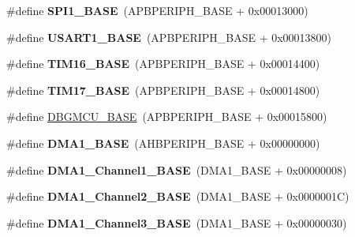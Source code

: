 \begin{DoxyCompactItemize}
\#define {\bfseries S\+P\+I1\+\_\+\+B\+A\+SE}~(A\+P\+B\+P\+E\+R\+I\+P\+H\+\_\+\+B\+A\+SE + 0x00013000)
\item 
\mbox{\label{group___peripheral__memory__map_ga86162ab3f740db9026c1320d46938b4d}} 
\#define {\bfseries U\+S\+A\+R\+T1\+\_\+\+B\+A\+SE}~(A\+P\+B\+P\+E\+R\+I\+P\+H\+\_\+\+B\+A\+SE + 0x00013800)
\item 
\mbox{\label{group___peripheral__memory__map_ga16c97093a531d763b0794c3e6d09e1bf}} 
\#define {\bfseries T\+I\+M16\+\_\+\+B\+A\+SE}~(A\+P\+B\+P\+E\+R\+I\+P\+H\+\_\+\+B\+A\+SE + 0x00014400)
\item 
\mbox{\label{group___peripheral__memory__map_gaffbedbe30e8c4cffdea326d6c1800574}} 
\#define {\bfseries T\+I\+M17\+\_\+\+B\+A\+SE}~(A\+P\+B\+P\+E\+R\+I\+P\+H\+\_\+\+B\+A\+SE + 0x00014800)
\item 
\#define \hyperlink{group___peripheral__memory__map_ga4adaf4fd82ccc3a538f1f27a70cdbbef}{D\+B\+G\+M\+C\+U\+\_\+\+B\+A\+SE}~(A\+P\+B\+P\+E\+R\+I\+P\+H\+\_\+\+B\+A\+SE + 0x00015800)
\item 
\mbox{\label{group___peripheral__memory__map_gab2d8a917a0e4ea99a22ac6ebf279bc72}} 
\#define {\bfseries D\+M\+A1\+\_\+\+B\+A\+SE}~(A\+H\+B\+P\+E\+R\+I\+P\+H\+\_\+\+B\+A\+SE + 0x00000000)
\item 
\mbox{\label{group___peripheral__memory__map_ga888dbc1608243badeb3554ffedc7364c}} 
\#define {\bfseries D\+M\+A1\+\_\+\+Channel1\+\_\+\+B\+A\+SE}~(D\+M\+A1\+\_\+\+B\+A\+SE + 0x00000008)
\item 
\mbox{\label{group___peripheral__memory__map_ga38a70090eef3687e83fa6ac0c6d22267}} 
\#define {\bfseries D\+M\+A1\+\_\+\+Channel2\+\_\+\+B\+A\+SE}~(D\+M\+A1\+\_\+\+B\+A\+SE + 0x0000001\+C)
\item 
\mbox{\label{group___peripheral__memory__map_ga70b3d9f36ca9ce95b4e421c11154fe5d}} 
\#define {\bfseries D\+M\+A1\+\_\+\+Channel3\+\_\+\+B\+A\+SE}~(D\+M\+A1\+\_\+\+B\+A\+SE + 0x00000030)
\item 
\mbox{\label{group___peripheral__memory__map_ga1adc93cd0baf0897202c71110e045692}} 

\end{DoxyCompactItemize}

